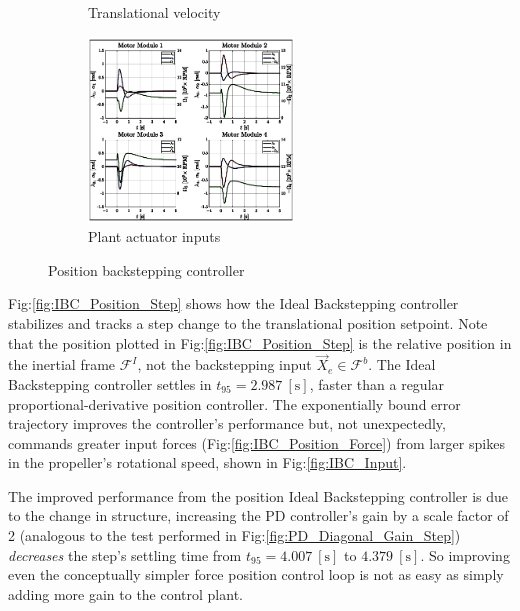 \begin{figure}[htbp]
\begin{subfigure}{0.49\textwidth}
\vspace{-20pt}
\caption{Translational velocity}
\label{fig:IBC_Position_Velocity}
\end{subfigure}
\begin{subfigure}{\textwidth}
\centering
\includegraphics[width=0.6\textwidth]{graphs/IBC_Position_Input}
\vspace{-8pt}
\caption{Plant actuator inputs}
\label{fig:IBC_Position_Input}
\end{subfigure}
\vspace{-8pt}
\caption{Position backstepping controller}
\vspace{-20pt}
\end{figure}
\par
Fig:\ref{fig:IBC_Position_Step} shows how the Ideal Backstepping controller stabilizes and tracks a step change to the translational position setpoint. Note that the position plotted in Fig:\ref{fig:IBC_Position_Step} is the relative position in the inertial frame $\mathcal{F}^{I}$, not the backstepping input $\vec{X}_e\in\mathcal{F}^b$. The Ideal Backstepping controller settles in $t_{95}=2.987~[\text{s}]$, faster than a regular proportional-derivative position controller. The exponentially bound error trajectory improves the controller's performance but, not unexpectedly, commands greater input forces (Fig:\ref{fig:IBC_Position_Force}) from larger spikes in the propeller's rotational speed, shown in Fig:\ref{fig:IBC_Input}. 
\par
The improved performance from the position Ideal Backstepping controller is due to the change in structure, increasing the PD controller's gain by a scale factor of 2 (analogous to the test performed in Fig:\ref{fig:PD_Diagonal_Gain_Step}) \emph{decreases} the step's settling time from $t_{95}=4.007~[\text{s}]$ to $4.379~[\text{s}]$. So improving even the conceptually simpler force position control loop is not as easy as simply adding more gain to the control plant. 
